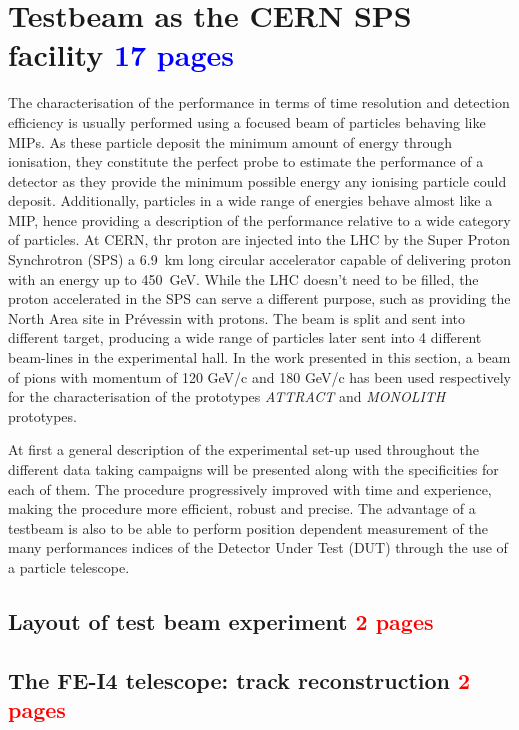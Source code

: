 	\section{Testbeam as the CERN SPS facility \textcolor{blue}{ 17 pages}}
	The characterisation of the performance in terms of time resolution and detection efficiency is usually performed using a focused beam of particles behaving like MIPs. As these particle deposit the minimum amount of energy through ionisation, they constitute the perfect probe to estimate the performance of a detector as they provide the minimum possible energy any ionising particle could deposit. Additionally, particles in a wide range of energies behave almost like a MIP, hence providing a description of the performance relative to a wide category of particles. 
	At CERN, thr proton are injected into the LHC by the Super Proton Synchrotron (SPS) a \SI{6.9}{\kilo\meter} long circular accelerator capable of delivering proton with an energy up to \SI{450}{\giga\electronvolt}. While the LHC doesn't need to be filled, the proton accelerated in the SPS can serve a different purpose, such as providing the North Area site in Prévessin with protons. The beam is split and sent into different target, producing a wide range of particles later sent into 4 different beam-lines in the experimental hall. In the work presented in this section, a beam of pions with momentum of 120 GeV/c and 180 GeV/c has been used respectively for the characterisation of the prototypes \textit{ATTRACT} and \textit{MONOLITH} prototypes. 
	
	At first a general description of the experimental set-up used throughout the different data taking campaigns will be presented along with the specificities for each of them. The procedure progressively improved with time and experience, making the procedure more efficient, robust and precise. The advantage of a testbeam is also to be able to perform position dependent measurement of the many performances indices of the Detector Under Test (DUT) through the use of a particle telescope.    
	
	
	
	
		\subsection{Layout of test beam experiment \textcolor{red}{ 2 pages}} 
		\subsection{The FE-I4 telescope: track reconstruction \textcolor{red}{ 2 pages}}
